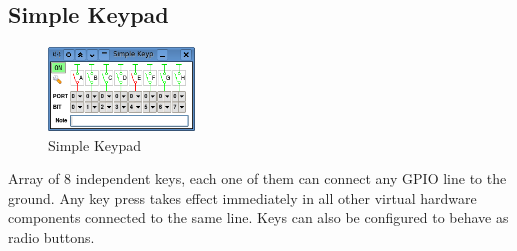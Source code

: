 \documentclass[a4paper,twoside,12pt]{book}
\begin{document}
		\clearpage
		\subsection{Simple Keypad}
			\begin{figure}
				\centering{}
				\includegraphics[width=110pt]{img/016.png}
				\caption{Simple Keypad}
			\end{figure}
			Array of 8 independent keys, each one of them can connect any GPIO line to the ground. Any key press takes effect immediately in all other virtual hardware components connected to the same line. Keys can also be configured to behave as radio buttons.

		\enlargethispage{6\baselineskip}
\end{document}
